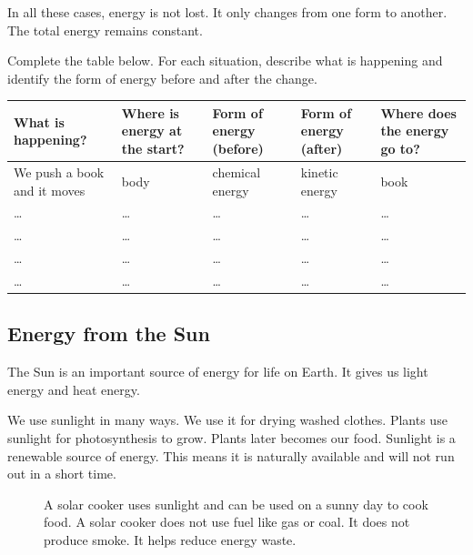 \documentclass{xtufte-handout}
\begin{document}
In all these cases, energy is not lost. It only changes from one form to another. The total energy remains constant.

Complete the table below. For each situation, describe what is happening and identify the form of energy before and after the change.

\begin{table}[h]
  \centering
  \selectfont
  \begin{tabular}{p{}p{}p{}p{}p{}} 
    \toprule
    What is happening? & Where is energy at the start? & Form of energy (before) & Form of energy (after) & Where does the energy go to?\\
    \midrule
    We push a book and it moves &body & chemical energy & kinetic energy & book \\
    \bottomrule    
    \ldots &\ldots & \ldots & \ldots & \ldots \\    \bottomrule
    \ldots &\ldots & \ldots & \ldots & \ldots \\    \bottomrule
    \ldots &\ldots & \ldots & \ldots & \ldots \\    \bottomrule
    \ldots &\ldots & \ldots & \ldots & \ldots \\    \bottomrule
  \end{tabular}
  \label{tab:energy-table}
\end{table}
\subsection{Energy from the Sun}
The Sun is an important source of energy for life on Earth. It gives us light energy and heat energy.

We use sunlight in many ways. We use it for drying washed clothes. Plants use sunlight for photosynthesis to grow. Plants later becomes our food.  Sunlight is a renewable source of energy. This means it is naturally available and will not run out in a short time.

\begin{figure}[h]
  \caption{A solar cooker uses sunlight and can be used on a sunny day to cook food. A solar cooker does not use fuel like gas or coal. It does not produce smoke. It helps reduce energy waste.}
\end{figure}
\end{document}
